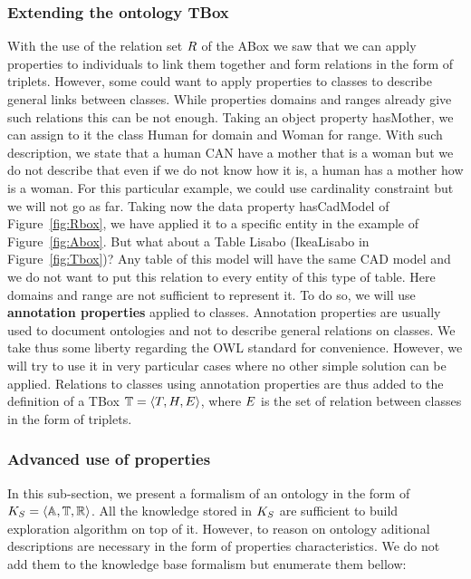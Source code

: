 \subsubsection{Extending the ontology TBox}

With the use of the relation set $R$ of the ABox we saw that we can apply properties to individuals to link them together and form relations in the form of triplets. However, some could want to apply properties to classes to describe general links between classes. While properties domains and ranges already give such relations this can be not enough. Taking an object property hasMother, we can assign to it the class Human for domain and Woman for range. With such description, we state that a human CAN have a mother that is a woman but we do not describe that even if we do not know how it is, a human has a mother how is a woman. For this particular example, we could use cardinality constraint but we will not go as far. Taking now the data property hasCadModel of Figure~\ref{fig:Rbox}, we have applied it to a specific entity in the example of Figure~\ref{fig:Abox}. But what about a Table Lisabo (IkeaLisabo in Figure~\ref{fig:Tbox})? Any table of this model will have the same CAD model and we do not want to put this relation to every entity of this type of table. Here domains and range are not sufficient to represent it. To do so, we will use \textbf{annotation properties} applied to classes. Annotation properties are usually used to document ontologies and not to describe general relations on classes. We take thus some liberty regarding the OWL standard for convenience. However, we will try to use it in very particular cases where no other simple solution can be applied. Relations to classes using annotation properties are thus added to the definition of a TBox $\mathbb{T} = \langle T, H, E \rangle$, where $E$ is the set of relation between classes in the form of triplets.

\subsubsection{Advanced use of properties}

In this sub-section, we present a formalism of an ontology in the form of $K_S = \langle \mathbb{A}, \mathbb{T}, \mathbb{R} \rangle$. All the knowledge stored in $K_S$ are sufficient to build exploration algorithm on top of it. However, to reason on ontology aditional descriptions are necessary in the form of properties characteristics. We do not add them to the knowledge base formalism but enumerate them bellow: 

